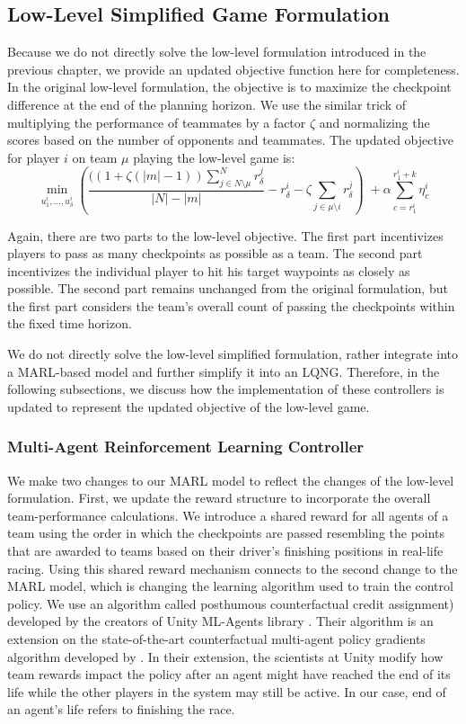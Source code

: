 \subsection{Low-Level Simplified Game Formulation}
Because we do not directly solve the low-level formulation introduced in the previous chapter, we provide an updated objective function here for completeness. In the original low-level formulation, the objective is to maximize the checkpoint difference at the end of the planning horizon. We use the similar trick of multiplying the performance of teammates by a factor $\zeta$ and normalizing the scores based on the number of opponents and teammates. The updated objective for player $i$ on team $\mu$ playing the low-level game is:
\begin{equation} \label{eq:ll_team_obj}
    \min_{u^i_{1}, ..., u^i_{\delta}} (\frac{((1+\zeta(|m|-1))\sum^N_{j \in N\setminus \mu}r^j_{\delta}}{|N|-|m|} -  r^i_{\delta} - \zeta\sum_{j \in \mu \setminus i}r^j_\delta) \; +  
    \alpha \sum_{c={r^i_{1}}}^{{r^i_{1}}+k} \eta^i_c
\end{equation}

Again, there are two parts to the low-level objective. The first part incentivizes players to pass as many checkpoints as possible as a team. The second part incentivizes the individual player to hit his target waypoints as closely as possible. The second part remains unchanged from the original formulation, but the first part considers the team's overall count of passing the checkpoints within the fixed time horizon. 

We do not directly solve the low-level simplified formulation, rather integrate into a MARL-based model and further simplify it into an LQNG. Therefore, in the following subsections, we discuss how the implementation of these controllers is updated to represent the updated objective of the low-level game.

\subsubsection{Multi-Agent Reinforcement Learning Controller}
We make two changes to our MARL model to reflect the changes of the low-level formulation. First, we update the reward structure to incorporate the overall team-performance calculations. We introduce a shared reward for all agents of a team using the order in which the checkpoints are passed resembling the points that are awarded to teams based on their driver's finishing positions in real-life racing. Using this shared reward mechanism connects to the second change to the MARL model, which is changing the learning algorithm used to train the control policy. We use an algorithm called posthumous counterfactual credit assignment) developed by the creators of Unity ML-Agents library \cite{poca}. Their algorithm is an extension on the state-of-the-art counterfactual multi-agent policy gradients algorithm developed by \citet{coma}. In their extension, the scientists at Unity modify how team rewards impact the policy after an agent might have reached the end of its life while the other players in the system may still be active. In our case, end of an agent's life refers to finishing the race. 

